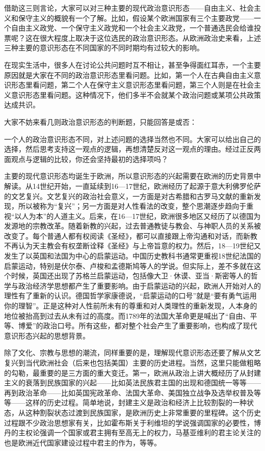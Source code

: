 借助这三则言论，大家可以对三种主要的现代政治意识形态——自由主义、社会主义和保守主义的概貌有一个了解。比如，假设某个欧洲国家有三个主要政党——一个自由主义政党、一个保守主义政党和一个社会主义政党，一个普通选民会给谁投票呢？这在很大程度上取决于这位选民的政治意识形态。从欧洲政治史来看，上述三种主要的意识形态在不同国家的不同时期均有过较大的影响。

在现实生活中，很多人在讨论公共问题时互不相让，甚至争得面红耳赤，一个主要原因就是大家在不同的政治意识形态里看问题。比如，第一个人在古典自由主义意识形态里看问题，第二个人在保守主义意识形态里看问题，第三个人则是在社会主义意识形态里看问题。这种情况下，他们多半不会就某个政治问题或某项公共政策达成共识。

大家不妨来看几则政治意识形态的判断题，只能回答是或否：


一个人的政治意识形态不同，对上述问题的选择当然也不同。大家可以给出自己的选择，然后思考支持这一观点的逻辑，再想清楚反对这一观点的理由。经过正反两面观点与逻辑的比较，你还会坚持最初的选择项吗？


主要的现代意识形态均诞生于欧洲，所以意识形态的兴起需要在欧洲的历史背景中解读。从14世纪开始，一直延续到16—17世纪，欧洲经历了起源于意大利佛罗伦萨的文艺复兴。文艺复兴的政治社会意义，一方面是对古希腊和古罗马文献的重新发现，所以被称为“复兴”；另一方面是对人性看法的改变，整个思潮逐步趋向于重视“以人为本”的人道主义。后来，在16—17世纪，欧洲很多地区又经历了以德国为发源地的宗教改革。随着新教的兴起，过去普通教徒与教会、与神职人员的关系被改变了。每个普通人都有权阅读《圣经》，都可以直接跟上帝沟通和对话，而新教不再认为天主教会有权垄断诠释《圣经》与上帝旨意的权力。然后，18—19世纪又发生了以英国和法国为中心的启蒙运动。中国历史教科书通常更重视18世纪法国的启蒙运动，特别是伏尔泰、卢梭和孟德斯鸠等人的学说。但实际上，差不多就在这个时候，英国还出现了苏格兰启蒙运动，包括像大卫·休谟、亚当·斯密等人的哲学与政治经济学思想都产生了重要影响。由于启蒙运动的兴起，欧洲人开始对人的理性有了重新的认识。德国哲学家康德说，“启蒙运动的口号”就是“要有勇气运用你的理智”。正是这种对人性前所未有的尊重和对人类理性的重新发现，人本身的地位被抬高到过去从未有过的高度。而1789年的法国大革命更是喊出了“自由、平等、博爱”的政治口号。所有这些，都对整个社会产生了重要影响，也构成了现代意识形态兴起的思想背景。

除了文化、宗教与思想的潮流，同样重要的是，理解现代意识形态还要了解从文艺复兴到当代欧洲社会（后来也包括美国）主要的历史进程。当然，这里只能做粗略的勾勒，最重要的是三方面的重大变迁。第一，欧洲从政治上讲大概经历了从封建主义的衰落到民族国家的兴起——比如英法民族君主国的出现和德国统一等等——再到政治革命——比如英国宪政革命、法国大革命、美国独立战争及选举权普及等等——这样的历史过程。简单地说，封建主义是政治和经济上比较割裂的一种状态，从这种割裂状态过渡到民族国家，是欧洲历史上非常重要的里程碑。这个历史过程跟不少政治思想家有关，比如霍布斯关于利维坦的学说强调国家的必要性，博丹的主权论强调一个国家或君主拥有至高无上的权力，马基亚维利的君主论关注的也是欧洲近代国家建设过程中君主的作为，等等。

